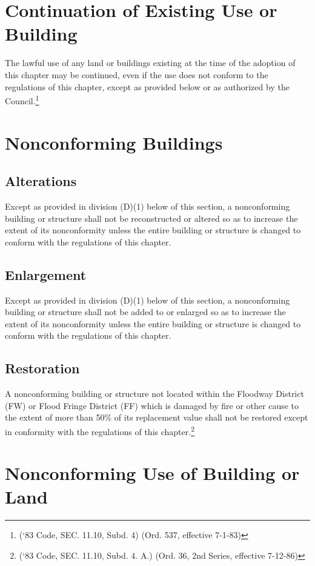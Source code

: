 
\setcounter{section}{114}
\section{Continuation of Existing Use or Building}
The lawful use of any land or buildings existing at the time of the adoption of this chapter may be continued, even if the use does not conform to the regulations of this chapter, except as provided below or as authorized by the Council.\footnote{(‘83 Code, SEC. 11.10, Subd. 4)  (Ord. 537, effective 7-1-83)}

\section{Nonconforming Buildings}
\subsection{Alterations}
Except as provided in division (D)(1) below of this section, a nonconforming building or structure shall not be reconstructed or altered so as to increase the extent of its nonconformity unless the entire building or structure is changed to conform with the regulations of this chapter.
\subsection{Enlargement}
Except as provided in division (D)(1) below of this section, a nonconforming building or structure shall not be added to or enlarged so as to increase the extent of its nonconformity unless the entire building or structure is changed to conform with the regulations of this chapter.
\subsection{Restoration}
A nonconforming building or structure not located within the Floodway District (FW) or Flood Fringe District (FF) which is damaged by fire or other cause to the extent of more than 50\% of its replacement value shall not be restored except in conformity with the regulations of this chapter.\footnote{(‘83 Code, SEC. 11.10, Subd. 4. A.)  (Ord. 36, 2nd Series, effective 7-12-86)}

\section{Nonconforming Use of Building or Land}
